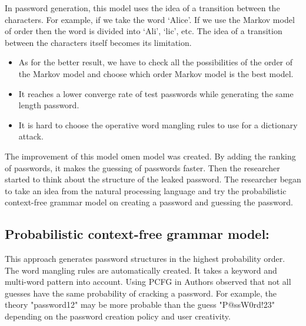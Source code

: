 \documentclass[runningheads]{llncs}
\newcommand{\singlequotes}[1]{`#1'}
\begin{document}
In password generation, this model uses the idea of a transition between the characters. For example, if we take the word \singlequotes{Alice}. If we use the Markov model of  order then the word is divided into \singlequotes{Ali}, \singlequotes{lic}, etc. The idea of a transition between the characters itself becomes its limitation.
\begin{itemize}
\item As for the better result, we have to check all the possibilities of the order of the Markov model and choose which order Markov model is the best model.\item It reaches a lower converge rate of test passwords while generating the same length password.  \item It is hard to choose the operative word mangling rules to use for a dictionary attack.
\end{itemize}The improvement of this model omen model\cite{10.1007/978-3-319-15618-7_10} was created. By adding the ranking of passwords, it makes the guessing of passwords faster.
Then the researcher started to think about the structure of the leaked password. The researcher began to take an idea from the natural processing language and try the probabilistic context-free grammar model\cite{5207658} on creating a password and guessing the password.
\\

\subsection{\textbf{Probabilistic context-free grammar model:}} 
\newline
This approach generates password structures in the highest probability order. The word mangling rules are automatically created. It takes a keyword and multi-word pattern into account. \cite{7098389} Using PCFG in \cite{5207658} Authors observed that not all guesses have the same probability of cracking a password. For example, the theory "password12" may be more probable than the guess "P@ssW0rd!23" depending on the password creation policy and user creativity.
\newline
\\
\end{document}
